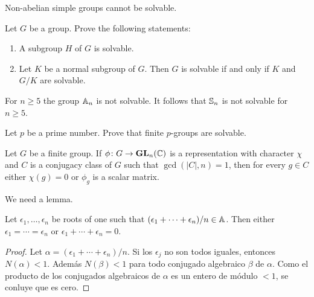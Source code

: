 \begin{example}
	Non-abelian simple groups cannot be solvable. 
\end{example}

\begin{exercise}
	\label{xca:solvable}
	Let $G$ be a group. Prove the following statements:
	\begin{enumerate}
		\item A subgroup $H$ of $G$ is solvable.
		\item Let $K$ be a normal subgroup of $G$. 
		    Then $G$ is solvable if and only if $K$ and $G/K$ are solvable.
	\end{enumerate}
\end{exercise}

\begin{example}
	For $n\geq5$ the group $\mathbb{A}_n$ is not solvable. It follows that 
	$\mathbb{S}_n$ is not solvable for $n\geq5$. 
\end{example}

\begin{exercise}
\label{xca:pgroups_solvable}
	Let $p$ be a prime number. Prove that 
	finite $p$-groups are solvable.
\end{exercise}

\begin{theorem}[Burnside]
	\label{thm:Burnside_auxiliar}
	Let $G$ be a finite group. If $\phi\colon G\to\mathbf{GL}_n(\mathbb{C})$ is a representation
	with character $\chi$ and $C$ is a conjugacy class of $G$ such that 
	$\gcd(|C|,n)=1$, then for every $g\in C$ either 
	$\chi(g)=0$ or $\phi_g$ is a scalar matrix. 
\end{theorem}

We need a lemma.

\begin{lemma}
	\label{lem:4Burnside}
	Let $\epsilon_1,\dots,\epsilon_n$ be roots of one such that 
	$(\epsilon_1+\cdots+\epsilon_n)/n\in\mathbb{A}$. Then either 
	$\epsilon_1=\cdots=\epsilon_n$ or 
	$\epsilon_1+\cdots+\epsilon_n=0$.
\end{lemma}

\begin{proof}
	Let $\alpha=(\epsilon_1+\cdots+\epsilon_n)/n$.
	Si los $\epsilon_j$ no son todos iguales, entonces $N(\alpha)<1$. Además 
	$N(\beta)<1$ para todo conjugado algebraico $\beta$ de $\alpha$. Como el
	producto de los conjugados algebraicos de $\alpha$ es un entero de módulo
	$<1$, se conluye que es cero.
\end{proof}

